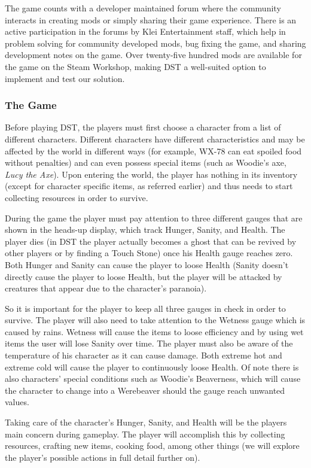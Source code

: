 The game counts with a developer maintained forum where the community interacts in creating mods or simply sharing their game experience.
There is an active participation in the forums by Klei Entertainment staff, which help in problem solving for community developed mods, bug fixing the game, and sharing development notes on the game.
Over twenty-five hundred mods are available for the game on the Steam Workshop, making \ac{DST} a well-suited option to implement and test our solution.

\subsubsection{The Game}
Before playing \ac{DST}, the players must first choose a character from a list of different characters.
Different characters have different characteristics and may be affected by the world in different ways (for example, WX-78 can eat spoiled food without penalties) and can even possess special items (such as Woodie's axe, \textit{Lucy the Axe}).
Upon entering the world, the player has nothing in its inventory (except for character specific items, as referred earlier) and thus needs to start collecting resources in order to survive.

During the game the player must pay attention to three different gauges that are shown in the heads-up display, which track Hunger, Sanity, and Health.
The player dies (in \ac{DST} the player actually becomes a ghost that can be revived by other players or by finding a Touch Stone) once his Health gauge reaches zero.
Both Hunger and Sanity can cause the player to loose Health (Sanity doesn't directly cause the player to loose Health, but the player will be attacked by creatures that appear due to the character's paranoia).

So it is important for the player to keep all three gauges in check in order to survive.
The player will also need to take attention to the Wetness gauge which is caused by rains. Wetness will cause the items to loose efficiency and by using wet items the user will lose Sanity over time.
The player must also be aware of the temperature of his character as it can cause damage. Both extreme hot and extreme cold will cause the player to continuously loose Health.
Of note there is also characters' special conditions such as Woodie's Beaverness, which will cause the character to change into a Werebeaver should the gauge reach unwanted values.

Taking care of the character's Hunger, Sanity, and Health will be the players main concern during gameplay.
The player will accomplish this by collecting resources, crafting new items, cooking food, among other things (we will explore the player's possible actions in full detail further on).

